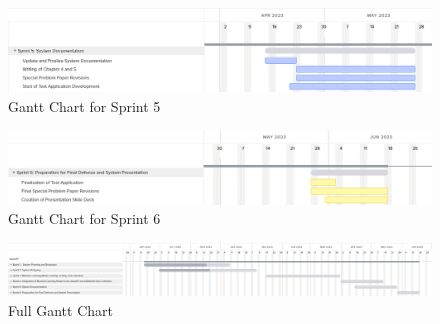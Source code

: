 \begin{figure}
    \centering
    \includegraphics[width=1\textwidth]{./assets/Gantt_Chart_Sprint5.png}
    \caption{Gantt Chart for Sprint 5}
    \label{fig:gantt_chart_sprint5}
\end{figure}

\begin{figure}
    \centering
    \includegraphics[width=1\textwidth]{./assets/Gantt_Chart_Sprint6.png}
    \caption{Gantt Chart for Sprint 6}
    \label{fig:gantt_chart_sprint6}
\end{figure}

\begin{figure}
    \centering
    \includegraphics[width=1\textwidth]{./assets/Gantt_Chart_Full.png}
    \caption{Full Gantt Chart}
    \label{fig:gantt_chart_full}
\end{figure}